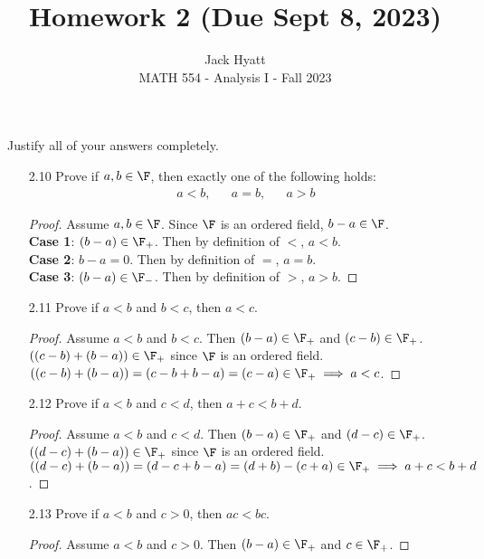 \documentclass[12pt]{article}
\begin{document}
	
	
	
	\title{Homework 2 (Due Sept 8, 2023)}
	\author{Jack Hyatt\\ %
		MATH 554 - Analysis I - Fall 2023} 
	
	\maketitle
	
	Justify all of your answers completely.\\
	
	
	\medskip 
	
	\begin{enumerate}
		\item[2.10] Prove if $a,b\in\F$, then exactly one of the following holds:\begin{align*}a<b,&&a=b,&&a>b 
		\end{align*}
		\begin{proof}
			Assume $a,b\in\F$. Since $\F$ is an ordered field, $b-a\in\F$.
			\\\textbf{Case 1}: $(b-a)\in\F_+$. Then by definition of $<$, $a<b$.
			\\\textbf{Case 2}: $b-a=0$. Then by definition of $=$, $a=b$.
			\\\textbf{Case 3}: $(b-a)\in\F_-$. Then by definition of $>$, $a>b$.
		\end{proof}
		\item[2.11] Prove if $a<b$ and $b<c$, then $a<c$.
		\begin{proof}
			Assume $a<b$ and $b<c$. Then $(b-a)\in\F_+$ and $(c-b)\in\F_+$.
			$((c-b)+(b-a))\in\F_+$ since $\F$ is an ordered field. $((c-b)+(b-a)) = (c-b+b-a) = (c-a) \in \F_+ \implies a<c$.
		\end{proof} 
		\item[2.12] Prove if $a<b$ and $c<d$, then $a+c<b+d$.
		\begin{proof}
			Assume $a<b$ and $c<d$. Then $(b-a)\in\F_+$ and $(d-c)\in\F_+$.
			$((d-c)+(b-a))\in\F_+$ since $\F$ is an ordered field. $((d-c)+(b-a)) = (d-c+b-a) = (d+b)-(c+a) \in \F_+ \implies a+c<b+d$.
		\end{proof} 
		\item[2.13] Prove if $a<b$ and $c>0$, then $ac<bc$.
		\begin{proof}
			Assume $a<b$ and $c>0$. Then $(b-a)\in\F_+$ and $c\in\F_+$.

\end{proof}
\end{enumerate}
\end{document}
